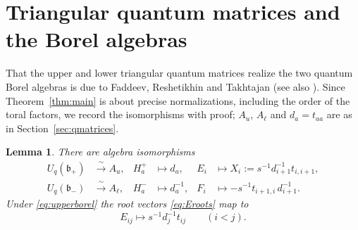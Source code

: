 \documentclass[11pt]{article}
\newtheorem{lemma}[theorem]{Lemma}
\theoremstyle{remark}
\newcommand{\U}{U_q}
\newcommand{\bp}{\mathfrak b_+}
\newcommand{\bm}{\mathfrak b_-}
\begin{document}
\section{Triangular quantum matrices and the Borel algebras}\label{sec:borel}

That the upper and lower triangular quantum matrices realize the two
quantum Borel algebras is due to Faddeev, Reshetikhin and Takhtajan
\cite{FRT} (see also \cite[Section 8.5]{KS}). Since
Theorem~\ref{thm:main} is about precise normalizations, including the
order of the toral factors, we record the isomorphisms with proof;
$A_u$, $A_\ell$ and $d_a=t_{aa}$ are as in Section~\ref{sec:qmatrices}.

\begin{lemma}\label{lem:borel}
There are algebra isomorphisms
\begin{align}
 \U(\bp)&\xrightarrow{\ \sim\ }A_u,&
 H^+_a&\longmapsto d_a,&
 E_i&\longmapsto X_i:=s^{-1}d_{i+1}^{-1}t_{i,i+1}, \label{eq:upperborel}\\
 \U(\bm)&\xrightarrow{\ \sim\ }A_\ell,&
 H^-_a&\longmapsto d_a^{-1},&
 F_i&\longmapsto -s^{-1}t_{i+1,i}\,d_{i+1}^{-1}. \label{eq:lowerborel}
\end{align}
Under \eqref{eq:upperborel} the root vectors \eqref{eq:Eroots} map to
\begin{equation}\label{eq:rootimageborel}
 E_{ij}\longmapsto s^{-1}d_j^{-1}t_{ij}\qquad(i<j).
\end{equation}
\end{lemma}
\end{document}
